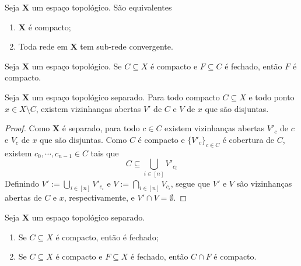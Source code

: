 \begin{proposition}
Seja $\bm X$ um espaço topológico. São equivalentes
	\begin{enumerate}
	\item $\bm X$ é compacto;
	\item Toda rede em $\bm X$ tem sub-rede convergente.
	\end{enumerate}
\end{proposition}

\begin{proposition}
Seja $\bm X$ um espaço topológico. Se $C \subseteq X$ é compacto e $F \subseteq C$ é fechado, então $F$ é compacto.
\end{proposition}

\begin{proposition}
\label{topo:prop.esp.sep.comp.pont}
Seja $\bm X$ um espaço topológico separado. Para todo compacto $C \subseteq X$ e todo ponto $x \in X \setminus C$, existem vizinhanças abertas $V'$ de $C$ e $V$ de $x$ que são disjuntas.
\end{proposition}
\begin{proof}
Como $\bm X$ é separado, para todo $c \in C$ existem vizinhanças abertas $V'_c$ de $c$ e $V_c$ de $x$ que são disjuntas. Como $C$ é compacto e $\{V'_c\}_{c \in C}$ é cobertura de $C$, existem $c_0,\cdots,c_{n-1} \in C$ tais que
	\begin{equation*}
	C \subseteq \bigcup_{i \in [n]} V'_{c_i}
	\end{equation*}
Definindo $V' := \bigcup_{i \in [n]} V'_{c_i}$ e $V := \bigcap_{i \in [n]} V_{c_i}$, segue que $V'$ e $V$ são vizinhanças abertas de $C$ e $x$, respectivamente, e $V' \cap V = \emptyset$.
\end{proof}

\begin{proposition}
Seja $\bm X$ um espaço topológico separado.
	\begin{enumerate}
	\item Se $C \subseteq X$ é compacto, então é fechado;
	\item Se $C \subseteq X$ é compacto e $F \subseteq X$ é fechado, então $C \cap F$ é compacto.
	\end{enumerate}
\end{proposition}

